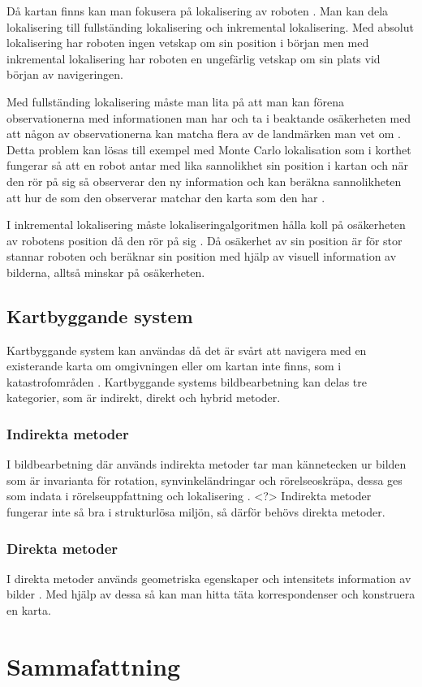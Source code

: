 Då kartan finns kan man fokusera på lokalisering av roboten \citep{982903}. Man kan dela lokalisering till fullständing lokalisering och inkremental lokalisering. Med absolut lokalisering har roboten ingen vetskap om sin position i början men med inkremental lokalisering har roboten en ungefärlig vetskap om sin plats vid början av navigeringen. 

Med fullständing lokalisering måste man lita på att man kan förena observationerna med informationen man har och ta i beaktande osäkerheten med att någon av observationerna kan matcha flera av de landmärken man vet om \citep{982903}. Detta problem kan lösas till exempel med Monte Carlo lokalisation som i korthet fungerar så att en robot antar med lika sannolikhet sin position i kartan och när den rör på sig så observerar den ny information och kan beräkna sannolikheten att hur de som den observerar matchar den karta som den har \citep{772544}.

I inkremental lokalisering måste lokaliseringalgoritmen hålla koll på osäkerheten av robotens position då den rör på sig \citep{722544}. Då osäkerhet av sin position är för stor stannar roboten och beräknar sin position med hjälp av visuell information av bilderna, alltså minskar på osäkerheten.

\section{Kartbyggande system}

Kartbyggande system kan användas då det är svårt att navigera med en existerande karta om omgivningen eller om kartan inte finns, som i katastrofområden \citep{geospatial}. Kartbyggande systems bildbearbetning kan delas tre kategorier, som är indirekt, direkt och hybrid metoder.

\subsection{Indirekta metoder}

I bildbearbetning där används indirekta metoder tar man kännetecken ur bilden som är invarianta för rotation, synvinkeländringar och rörelseoskräpa, dessa ges som indata i rörelseuppfattning och lokalisering \citep{geospatial}. <?> Indirekta metoder fungerar inte så bra i strukturlösa miljön, så därför behövs direkta metoder. 

\subsection{Direkta metoder}

I direkta metoder används geometriska egenskaper och intensitets information av bilder \citep{geospatial}. Med hjälp av dessa så kan man hitta täta korrespondenser och konstruera en karta. 

\chapter{Sammafattning}

\iffalse
Mäst är inomhus av drönaren
Problem med beräkning, pga batteri kapacitet och komplexa algoritmer och bildbearbetningsalgoritmer
\fi

